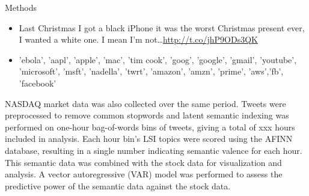 \documentclass[final]{beamer}
\newlength{\onecolwid}
\begin{document}
\begin{frame}[t]
\begin{columns}[t]
\begin{column}{\onecolwid}
\begin{block}{Methods}
{\begin{itemize}
            \item \small{Last Christmas I got a black iPhone it was the
                worst Christmas present ever, I wanted a white one. I mean I'm
                not\ldots \url{http://t.co/jhP9ODs3QK}}
            \end{itemize}
            \begin{itemize}\label{keywords}
            \item \small{ 'ebola', 'aapl', 'apple', 'mac', 'tim cook', 'goog',
            'google', 'gmail', 'youtube', 'microsoft', 'msft',
            'nadella', 'twrt', 'amazon', 'amzn', 'prime', 'aws','fb',
          'facebook'}
          \end{itemize}
          NASDAQ market data was also
          collected over the same period. Tweets were preprocessed to remove
          common stopwords and latent semantic indexing was performed on
          one-hour bag-of-words bins of tweets, giving a total of xxx hours
          included in analysis. Each hour bin's LSI topics were scored using
          the AFINN database, resulting in a single number indicating semantic
          valence for each hour. This semantic data was combined with the stock
          data for visualization and analysis. A vector autoregressive (VAR)
          model was performed to assess the predictive power of the semantic
          data against the stock data.
          }
      \end{block}
    \end{column}


\end{columns}
\end{frame}
\end{document}
